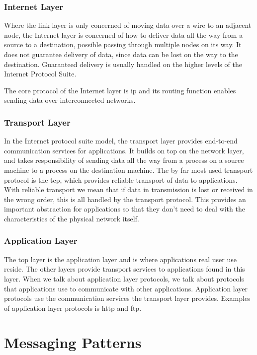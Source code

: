 \subsubsection{Internet Layer}

 Where the link layer is only concerned of moving data over a wire to an
 adjacent node, the Internet layer is concerned of how to deliver data all the
 way from a source to a destination, possible passing through multiple nodes on
 its way. It does not guarantee delivery of data, since data can be lost on the
 way to the destination. Guaranteed delivery is usually handled on the higher
 levels of the Internet Protocol Suite.

 The core protocol of the Internet layer is \gls{ip} and its routing function
 enables sending data over interconnected networks.

\subsubsection{Transport Layer}

In the Internet protocol suite model, the transport layer provides end-to-end
communication services for applications. It builds on top on the network layer,
and takes responsibility of sending data all the way from a process on a source
machine to a process on the destination machine. The by far most used transport
protocol is the \gls{tcp}, which provides reliable transport of data to
applications. With reliable transport we mean that if data in transmission is
lost or received in the wrong order, this is all handled by the transport
protocol. This provides an important abstraction for applications so that they
don't need to deal with the characteristics of the physical network itself.

\subsubsection{Application Layer}

The top layer is the application layer and is where applications real user use
reside. The other layers provide transport services to applications found in
this layer. When we talk about application layer protocols, we talk about
protocols that applications use to communicate with other applications.
Application layer protocols use the communication services the transport layer
provides.  Examples of application layer protocols is \gls{http} and \gls{ftp}.

\section{Messaging Patterns}

